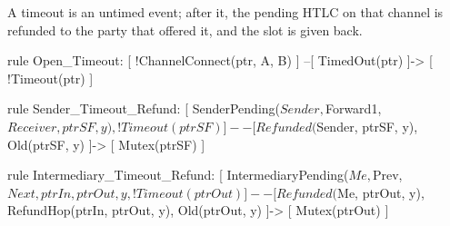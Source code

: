 A timeout is an untimed event; after it, the pending HTLC on that channel is refunded to the
party that offered it, and the slot is given back.
\begin{spthy}
rule Open_Timeout:
    [ !ChannelConnect(ptr, A, B) ] --[ TimedOut(ptr) ]-> [ !Timeout(ptr) ]

rule Sender_Timeout_Refund:
    [ SenderPending($Sender, $Forward1, $Receiver, ptrSF, y), !Timeout(ptrSF) ]
    --[ Refunded($Sender, ptrSF, y),
        Old(ptrSF, y) ]->
    [ Mutex(ptrSF) ]

rule Intermediary_Timeout_Refund:
    [ IntermediaryPending($Me, $Prev, $Next, ptrIn, ptrOut, y, %
      !Timeout(ptrOut) ]
    --[ Refunded($Me, ptrOut, y),
        RefundHop(ptrIn, ptrOut, y),
        Old(ptrOut, y) ]->
    [ Mutex(ptrOut) ]
\end{spthy}
